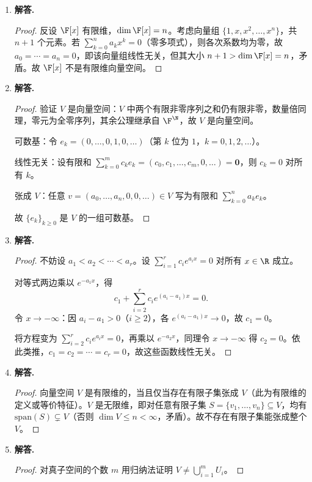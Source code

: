\begin{enumerate}[label=\textbf{\arabic*.}, leftmargin=*, itemsep=1em]

\item \textbf{解答.}
\begin{proof}
反设 $\F[x]$ 有限维，$\dim\F[x]=n$。考虑向量组 $\{1,x,x^2,\dots,x^n\}$，共 $n+1$ 个元素。若 $\sum_{k=0}^n a_kx^k=0$（零多项式），则各次系数均为零，故 $a_0=\cdots=a_n=0$，即该向量组线性无关，但其大小 $n+1>\dim\F[x]=n$，矛盾。故 $\F[x]$ 不是有限维向量空间。
\end{proof}

\item \textbf{解答.}
\begin{proof}
验证 $V$ 是向量空间：$V$ 中两个有限非零序列之和仍有限非零，数量倍同理，零元为全零序列，其余公理继承自 $\F^{\N}$，故 $V$ 是向量空间。

可数基：令 $e_k=(0,\dots,0,1,0,\dots)$（第 $k$ 位为 $1$，$k=0,1,2,\dots$）。

线性无关：设有限和 $\sum_{k=0}^m c_ke_k=(c_0,c_1,\dots,c_m,0,\dots)=\mathbf{0}$，则 $c_k=0$ 对所有 $k$。

张成 $V$：任意 $v=(a_0,\dots,a_n,0,0,\dots)\in V$ 写为有限和 $\sum_{k=0}^n a_ke_k$。

故 $\{e_k\}_{k\ge 0}$ 是 $V$ 的一组可数基。
\end{proof}

\item \textbf{解答.}
\begin{proof}
不妨设 $a_1<a_2<\cdots<a_r$。设 $\sum_{i=1}^r c_ie^{a_ix}=0$ 对所有 $x\in\R$ 成立。

对等式两边乘以 $e^{-a_1x}$，得
\[
c_1+\sum_{i=2}^r c_ie^{(a_i-a_1)x}=0.
\]
令 $x\to-\infty$：因 $a_i-a_1>0$（$i\ge 2$），各 $e^{(a_i-a_1)x}\to 0$，故 $c_1=0$。

将方程变为 $\sum_{i=2}^r c_ie^{a_ix}=0$，再乘以 $e^{-a_2x}$，同理令 $x\to-\infty$ 得 $c_2=0$。依此类推，$c_1=c_2=\cdots=c_r=0$，故这些函数线性无关。
\end{proof}

\item \textbf{解答.}
\begin{proof}
向量空间 $V$ 是有限维的，当且仅当存在有限子集张成 $V$（此为有限维的定义或等价特征）。$V$ 是无限维，即对任意有限子集 $S=\{v_1,\dots,v_n\}\subseteq V$，均有 $\mathrm{span}(S)\subsetneq V$（否则 $\dim V\le n<\infty$，矛盾）。故不存在有限子集能张成整个 $V$。
\end{proof}

\item \textbf{解答.}
\begin{proof}
对真子空间的个数 $m$ 用归纳法证明 $V\ne\bigcup_{i=1}^m U_i$。


\end{proof}
\end{enumerate}

